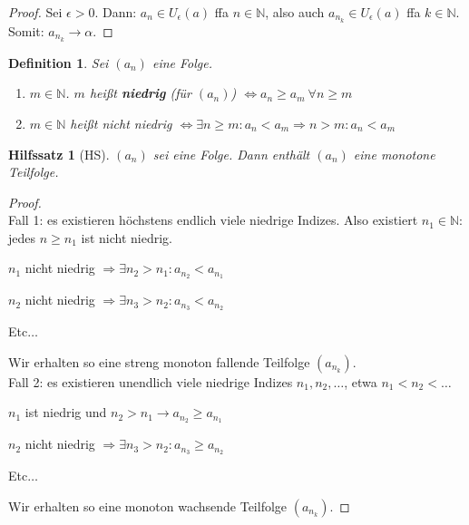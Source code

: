 \documentclass[12pt]{extreport} %
\newcommand{\N}{\mathbb{N}}
\theoremstyle{named}
\theoremstyle{dotless}
\newtheorem*{definition}{Definition}
\newtheorem*{hilfssatz*}{Hilfssatz}
\begin{document}
\begin{proof}
	Sei $\epsilon > 0$. Dann: $a_{n} \in U_{\epsilon}(a)$ ffa $n \in \N$, also auch $a_{n_{k}} \in U_{\epsilon}(a)$ ffa $k \in \N$. Somit: $a_{n_{k}} \rightarrow \alpha$.
\end{proof}

\begin{definition} Sei $(a_{n})$ eine Folge. 
	\begin{enumerate}
		\item $m \in \N$. $m$ hei{\ss}t \textbf{niedrig} (für $(a_{n})$) $\iff a_{n} \geq a_{m} ~\forall n \geq m $
		\item $m \in \N$ hei{\ss}t nicht niedrig $\iff \exists n \geq m: a_{n} < a_{m} \Rightarrow n > m: a_{n} < a_{m}$
	\end{enumerate}
\end{definition}


\begin{hilfssatz*}[HS]
	$(a_{n})$ sei eine Folge. Dann enthält $(a_{n})$ eine monotone Teilfolge.	
\end{hilfssatz*}

\begin{proof} ~\\
	Fall 1: es existieren höchstens endlich viele niedrige Indizes. Also existiert $n_{1} \in \N$: jedes $n \geq n_{1}$ ist nicht niedrig.
	\begin{description}
		\item $n_{1}$ nicht niedrig $\Rightarrow \exists n_{2} > n_{1} : a_{n_{2}} < a_{n_{1}}$
		\item $n_{2}$ nicht niedrig $\Rightarrow \exists n_{3} > n_{2} : a_{n_{3}} < a_{n_{2}}$
		\item Etc$\dotsc$
	\end{description}
	Wir erhalten so eine streng monoton fallende Teilfolge $(a_{n_{k}})$. \\
	Fall 2: es existieren unendlich viele niedrige Indizes $n_{1}, n_{2}, \dotsc$, etwa $n_{1} < n_{2} < \dotsc$
	\begin{description}
		\item $n_{1}$ ist niedrig und $n_{2} > n_{1} \rightarrow a_{n_{2}} \geq a_{n_{1}}$
		\item $n_{2}$ nicht niedrig $\Rightarrow \exists n_{3} > n_{2} : a_{n_{3}} \geq a_{n_{2}}$
		\item Etc$\dotsc$
	\end{description}
	Wir erhalten so eine monoton wachsende Teilfolge $(a_{n_{k}})$.
\end{proof}
\end{document}
